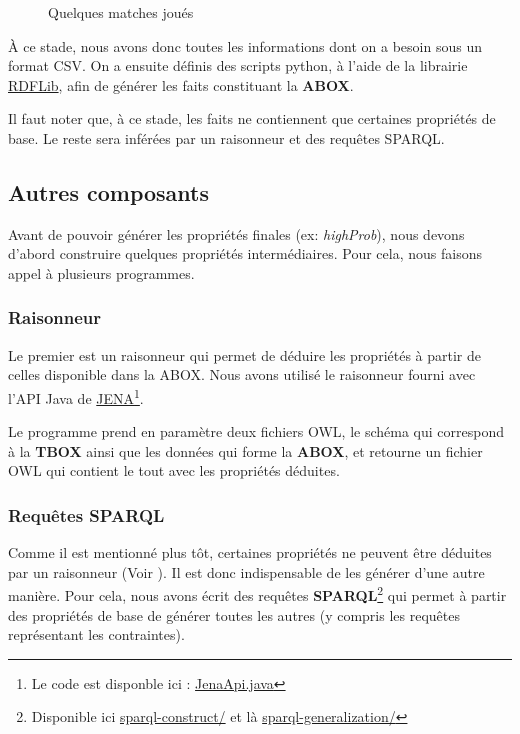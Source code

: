\documentclass[oneside,13pt,a4paper]{article}
\begin{document}
\begin{figure}[!h]
	\centering
    
    \caption{Quelques matches joués}
\end{figure}
  
À ce stade, nous avons donc toutes les informations dont on a besoin sous un format CSV. On a ensuite définis des scripts python, à l'aide de la librairie \href{https://github.com/RDFLib/rdflib}{RDFLib}, afin de générer les faits constituant la \textbf{ABOX}.

Il faut noter que, à ce stade, les faits ne contiennent que certaines propriétés de base. Le reste sera inférées par un raisonneur et des requêtes SPARQL.

\subsection{Autres composants}

Avant de pouvoir générer les propriétés finales (ex: \textit{highProb}), nous devons d’abord construire quelques propriétés intermédiaires. Pour cela, nous faisons appel à plusieurs programmes.
\subsubsection{Raisonneur}

Le premier est un raisonneur qui permet de déduire les propriétés à partir de celles disponible dans la ABOX. Nous avons utilisé le raisonneur fourni avec l'API Java de \href{https://jena.apache.org/}{JENA}\footnote{Le code est disponble ici : \href{../src/reasoner/JenaApi.java}{JenaApi.java}}.

Le programme prend en paramètre deux fichiers OWL, le schéma qui correspond à la \textbf{TBOX} ainsi que les données qui forme la \textbf{ABOX}, et retourne un fichier OWL qui contient le tout avec les propriétés déduites.

\subsubsection{Requêtes SPARQL}

Comme il est mentionné plus tôt, certaines propriétés ne peuvent être déduites par un raisonneur (Voir ). Il est donc indispensable de les générer d'une autre manière. Pour cela, nous avons écrit des requêtes \textbf{SPARQL}\footnote{Disponible ici \href{../ontologies/sparql-construct/.}{sparql-construct/} et là \href{../ontologies/sparql-generalization/.}{sparql-generalization/}} qui permet à partir des propriétés de base de générer toutes les autres (y compris les requêtes représentant les contraintes).
\end{document}
